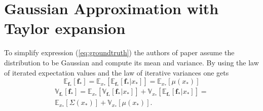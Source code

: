 \section{Gaussian Approximation with Taylor expansion}
          To simplify expression (\ref{eq:groundtruth}) the authors of paper \cite{Paper2:UncertainInputPredictions} assume the distribution to be Gaussian and compute its mean and variance. By using the law of iterated expectation values and the law of iterative variances one gets
        \begin{equation}
        \label{expGaussianApprox}
            \mathbb{E}_{\mathbf{f}_*}\left[ 
            \mathbf{f}_*
            \right]
            =
            \mathbb{E}_{x_*}\left[ 
            \mathbb{E}_{\mathbf f_*}\left[\mathbf{f}_{*}|x_*\right] 
            \right]
            =
            \mathbb{E}_{x_*}\left[ 
            \mu(x_*)
            \right ]    
        \end{equation}
        \begin{equation}
        \begin{split}
        \label{varGaussianApprox}
            \mathbb{V}_{\mathbf{f}_*}\left[ 
            \mathbf{f}_*
            \right]
            =
            \mathbb{E}_{x_*}\left[ 
            \mathbb{V}_{\mathbf{f}_*}\left[ 
            \mathbf{f}_* | x_*
            \right]
            \right]
            +
            \mathbb{V}_{x_*}\left[ 
            \mathbb{E}_{\mathbf f_*}\left[\mathbf{f}_{*}|x_*\right] 
            \right]
            =\\
            \mathbb{E}_{x_*}\left[ 
            \Sigma(x_*)
            \right]
            +
            \mathbb{V}_{x_*}\left[ 
            \mu(x_*)
            \right].
        \end{split}
        \end{equation}
